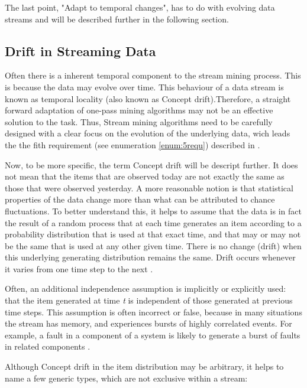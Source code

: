 \documentclass[12pt,oneside,a4paper,parskip]{scrbook}
\begin{document}
The last point, "Adapt to temporal changes", has to do with evolving data streams and will be described further in the following 
section.

\subsection{Drift in Streaming Data}
Often there is a inherent temporal component to the stream mining process. This is because the data may evolve over time. 
This behaviour of a data stream is known as temporal locality\cite{aggarwal2007data} (also known as Concept drift)\cite{MLonDataStreams}.Therefore, 
a straight forward adaptation of one-pass mining algorithms may not be an effective solution to the task.
Thus, Stream mining algorithms need to be carefully designed with a clear focus on the evolution of the underlying data, 
wich leads the the fith requirement (see enumeration \ref{enum:5requ}) described in \cite{MLonDataStreams}.

Now, to be more specific, the term Concept drift will be descript further.
It does not mean that the items that are observed today are not exactly the same as those that were observed yesterday. 
A more reasonable notion is that statistical properties of the data change more than what can be attributed to chance
fluctuations. To better understand this, it helps to assume that the data is in fact the result of a random process that
at each time generates an item according to a probability distribution that is used at that exact time, and that may or 
may not be the same that is used at any other given time. There is no change (drift) when this underlying generating distribution
remains the same. Drift occurs whenever it varies from one time step to the next \cite{MLonDataStreams}.

Often, an additional independence assumption is implicitly or explicitly used: that the item generated at time \textit{t} is 
independent of those generated at previous time steps. This assumption is often incorrect or false, because in many 
situations the stream has memory, and experiences bursts of highly correlated events. For example, a fault in a 
component of a system is likely to generate a burst of faults in related components \cite{MLonDataStreams}. 

Although Concept drift in the item distribution may be arbitrary, it helps to name a few generic types, 
which are not exclusive within a stream:
\end{document}
